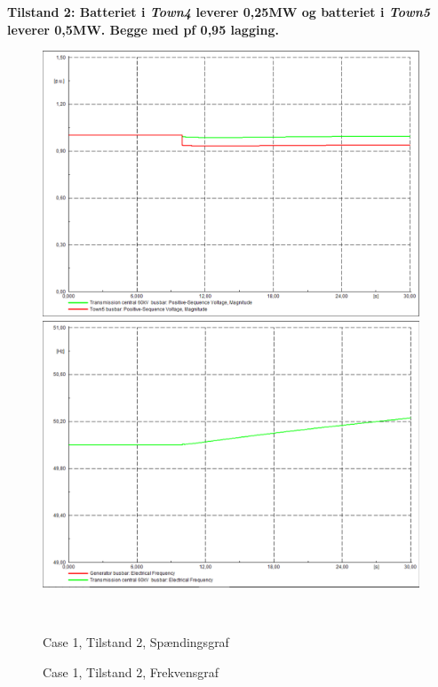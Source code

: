 \textbf{Tilstand 2: Batteriet i \textit{Town4} leverer 0,25MW og batteriet i \textit{Town5} leverer 0,5MW. Begge med pf 0,95 lagging.}
\begin{figure}[H]
	\centering
	\begin{minipage}[b]{0.48\textwidth}
		\centering
		\includegraphics[width=1.00\textwidth]{figurer/SmallDisturbance/Voltage2} %
	\end{minipage}
	\hfill
	\begin{minipage}[b]{0.48\textwidth}
		\centering
		\includegraphics[width=1.00\textwidth]{figurer/SmallDisturbance/Freq2} %
	\end{minipage}
	\\ %
	\begin{minipage}[t]{0.48\textwidth}
		\caption{Case 1, Tilstand 2, Spændingsgraf} %
		\label{fig:C1T2V}
	\end{minipage}
	\hfill
	\begin{minipage}[t]{0.48\textwidth}
		\caption{Case 1, Tilstand 2, Frekvensgraf} %
		\label{fig:C1T2F}
	\end{minipage}
\end{figure}


